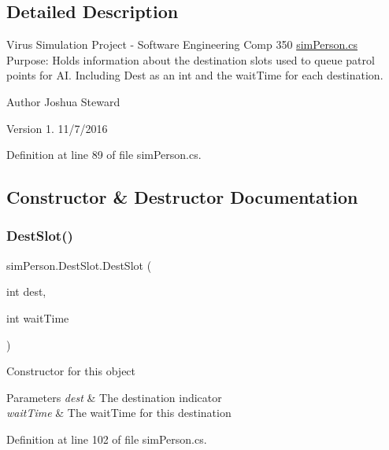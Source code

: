 \subsection{Detailed Description}
Virus Simulation Project -\/ Software Engineering Comp 350 \hyperlink{sim_person_8cs}{sim\+Person.\+cs} Purpose\+: Holds information about the destination slots used to queue patrol points for AI. Including Dest as an int and the wait\+Time for each destination.

\begin{DoxyAuthor}{Author}
Joshua Steward 
\end{DoxyAuthor}
\begin{DoxyVersion}{Version}
1. 11/7/2016 
\end{DoxyVersion}


Definition at line 89 of file sim\+Person.\+cs.



\subsection{Constructor \& Destructor Documentation}
\hypertarget{classsim_person_1_1_dest_slot_aa6596787998f78f3f15dc8de2a7a3ede}{}\label{classsim_person_1_1_dest_slot_aa6596787998f78f3f15dc8de2a7a3ede} 
\subsubsection{\texorpdfstring{Dest\+Slot()}{DestSlot()}}
{\footnotesize\ttfamily sim\+Person.\+Dest\+Slot.\+Dest\+Slot (\begin{DoxyParamCaption}\item[{int}]{dest,  }\item[{int}]{wait\+Time }\end{DoxyParamCaption})}

Constructor for this object


\begin{DoxyParams}{Parameters}
{\em dest} & The destination indicator \\
\hline
{\em wait\+Time} & The wait\+Time for this destination \\
\hline
\end{DoxyParams}


Definition at line 102 of file sim\+Person.\+cs.




